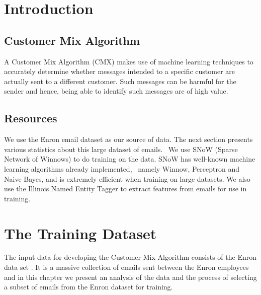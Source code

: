 \documentclass[senior,oneside]{UIUC}
\begin{document}
 \frontmatter

 \makepreliminarypages

 \tableofcontents

 \mainmatter


\chapter{Introduction}

\section{Customer Mix Algorithm}

A Customer Mix Algorithm (CMX) makes use of machine learning techniques to accurately determine whether messages intended to a specific customer are actually sent to a different customer. Such messages can be harmful for the sender and hence, being able to identify such messages are of high value. 

\section{Resources}

We use the Enron email dataset \cite{enrondataset} as our source of data. The next section presents various statistics about this large dataset of emails. \
We use SNoW (Sparse Network of Winnows) \cite{snow} to do training on the data. SNoW has well-known machine learning algorithms already implemented, \
namely Winnow, Perceptron and Naive Bayes, and is extremely efficient when training on large datasets. We also use the Illinois Named Entity Tagger \cite{nertagger} to extract features from emails for use in training. 

\chapter{The Training Dataset}

The input data for developing the Customer Mix Algorithm consists of the Enron data set \cite{enrondataset}. It is a massive collection of emails sent between the Enron employees and in this chapter we present an analysis of the data and the process of selecting a subset of  emails from the Enron dataset for training.
\end{document}
